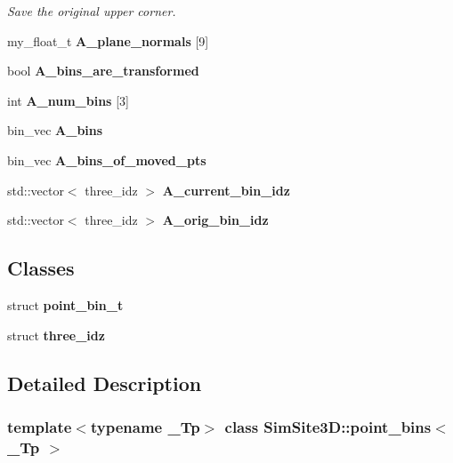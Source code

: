 \begin{CompactItemize}
\begin{CompactList}\small\item\em Save the original upper corner. \item\end{CompactList}\item 
my\_\-float\_\-t \textbf{A\_\-plane\_\-normals} [9]\label{classSimSite3D_1_1point__bins_cebae3f68f32e3ad48fb3671718af31c}

\item 
bool \textbf{A\_\-bins\_\-are\_\-transformed}\label{classSimSite3D_1_1point__bins_86ca99c80831c972f89b0b20a185c519}

\item 
int \textbf{A\_\-num\_\-bins} [3]\label{classSimSite3D_1_1point__bins_0e3467b19cfeec3ac7590c10359489b9}

\item 
bin\_\-vec \textbf{A\_\-bins}\label{classSimSite3D_1_1point__bins_2297473c684667dd9f33619dabb50095}

\item 
bin\_\-vec \textbf{A\_\-bins\_\-of\_\-moved\_\-pts}\label{classSimSite3D_1_1point__bins_4fc0db7bdcd0d6ca24626a770899ec73}

\item 
std::vector$<$ three\_\-idz $>$ \textbf{A\_\-current\_\-bin\_\-idz}\label{classSimSite3D_1_1point__bins_2026dd01beaac118d479d1649ca4c1f4}

\item 
std::vector$<$ three\_\-idz $>$ \textbf{A\_\-orig\_\-bin\_\-idz}\label{classSimSite3D_1_1point__bins_01f7a076413e0ade2db4a8b808e18416}

\end{CompactItemize}
\subsection*{Classes}
\begin{CompactItemize}
\item 
struct \textbf{point\_\-bin\_\-t}
\item 
struct \textbf{three\_\-idz}
\end{CompactItemize}


\subsection{Detailed Description}
\subsubsection*{template$<$typename \_\-Tp$>$ class SimSite3D::point\_\-bins$<$ \_\-Tp $>$}

